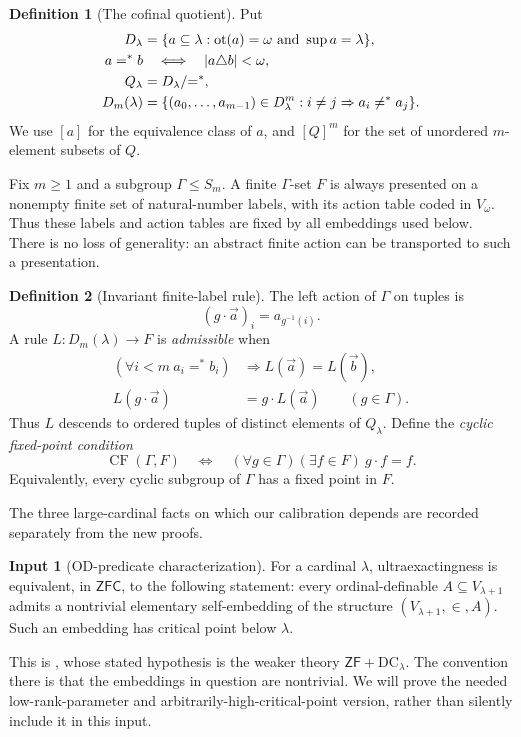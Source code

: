\documentclass[11pt,letterpaper]{article}
\theoremstyle{definition}
\newtheorem{definition}{Definition}[section]
\newtheorem{inputthm}{Input}
\numberwithin{equation}{section}
\newcommand{\ZFC}{\mathsf{ZFC}}
\newcommand{\ZF}{\mathsf{ZF}}
\newcommand{\ot}{\operatorname{ot}}
\newcommand{\CF}{\operatorname{CF}}
\newcommand{\HF}{V_\omega}
\newcommand{\Efin}{\mathrel{=^*}}
\begin{document}
\begin{definition}[The cofinal quotient]
Put
\begin{align}
 D_\lambda&=\{a\subseteq\lambda:\ot(a)=\omega\text{ and }\sup a=\lambda\},\\
 a\Efin b&\quad\Longleftrightarrow\quad |a\triangle b|<\omega,\\
 Q_\lambda&=D_\lambda/{\Efin},\\
 D_m(\lambda)&=\{(a_0,\ldots,a_{m-1})\in D_\lambda^m:
                      i\ne j\Rightarrow a_i\not\Efin a_j\}.
\end{align}
We use $[a]$ for the equivalence class of $a$, and $[Q]^m$ for the set of unordered $m$-element subsets of $Q$.
\end{definition}

Fix $m\ge1$ and a subgroup $\Gamma\le S_m$. A finite $\Gamma$-set $F$ is always presented on a nonempty finite set of natural-number labels, with its action table coded in $\HF$. Thus these labels and action tables are fixed by all embeddings used below. There is no loss of generality: an abstract finite action can be transported to such a presentation.

\begin{definition}[Invariant finite-label rule]\label{def:rule}
The left action of $\Gamma$ on tuples is
\[
 (g\cdot\vec a)_i=a_{g^{-1}(i)}.
\]
A rule $L:D_m(\lambda)\to F$ is \emph{admissible} when
\begin{align}
 (\forall i<m\ a_i\Efin b_i)&\Longrightarrow L(\vec a)=L(\vec b),\label{eq:fininv}\\
 L(g\cdot\vec a)&=g\cdot L(\vec a)\qquad(g\in\Gamma).\label{eq:equiv}
\end{align}
Thus $L$ descends to ordered tuples of distinct elements of $Q_\lambda$.
Define the \emph{cyclic fixed-point condition}
\[
 \CF(\Gamma,F)\quad\Longleftrightarrow\quad
       (\forall g\in\Gamma)(\exists f\in F)\ g\cdot f=f.
\]
Equivalently, every cyclic subgroup of $\Gamma$ has a fixed point in $F$.
\end{definition}

The three large-cardinal facts on which our calibration depends are recorded separately from the new proofs.

\begin{inputthm}[OD-predicate characterization]\label{in:predicate}
For a cardinal $\lambda$, ultraexactingness is equivalent, in $\ZFC$, to the following statement: every ordinal-definable $A\subseteq V_{\lambda+1}$ admits a nontrivial elementary self-embedding of the structure $(V_{\lambda+1},\in,A)$. Such an embedding has critical point below $\lambda$.
\end{inputthm}
This is \cite[Theorem 3.1]{abgl}, whose stated hypothesis is the weaker theory $\ZF+\mathrm{DC}_\lambda$. The convention there is that the embeddings in question are nontrivial. We will prove the needed low-rank-parameter and arbitrarily-high-critical-point version, rather than silently include it in this input.
\end{document}
